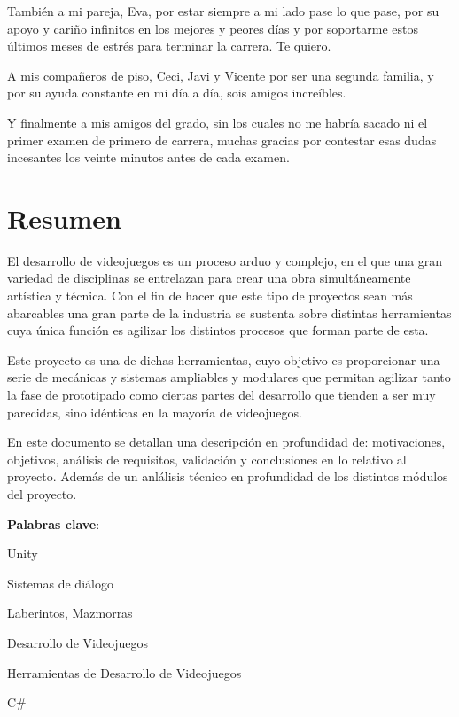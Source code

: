 \documentclass[12pt,twoside,titlepage]{report}
\newcommand\blankpage{%
    \newpage
    \null
    \thispagestyle{empty}%
    \newpage}
\begin{document}
También a mi pareja, Eva, por estar siempre a mi lado pase lo que pase, por su apoyo y cariño infinitos en los mejores y peores días y por soportarme estos últimos meses de estrés para terminar la carrera. Te quiero.

A mis compañeros de piso, Ceci, Javi y Vicente por ser una segunda familia, y por su ayuda constante en mi día a día, sois amigos increíbles.

Y finalmente a mis amigos del grado, sin los cuales no me habría sacado ni el primer examen de primero de carrera, muchas gracias por contestar esas dudas incesantes los veinte minutos antes de cada examen.


\afterpage{\blankpage}








\chapter*{Resumen}

El desarrollo de videojuegos es un proceso arduo y complejo, en el que una gran variedad de disciplinas se entrelazan para crear una obra simultáneamente artística y técnica.
 Con el fin de hacer que este tipo de proyectos sean más abarcables una gran parte de la industria se sustenta sobre distintas herramientas cuya única función es agilizar 
 los distintos procesos que forman parte de esta.

Este proyecto es una de dichas herramientas, cuyo objetivo es proporcionar una serie de mecánicas y sistemas ampliables y modulares que permitan agilizar tanto la fase de
 prototipado como ciertas partes del desarrollo que tienden a ser muy parecidas, sino idénticas en la mayoría de videojuegos.

En este documento se detallan una descripción en profundidad de: motivaciones, objetivos, análisis de requisitos, validación y conclusiones en lo relativo al proyecto.
 Además de un anlálisis técnico en profundidad de los distintos módulos del proyecto.

\mbox{} \bigskip

\noindent \textbf{Palabras clave}:
\begin{compactitem}
    \item Unity
    \item Sistemas de diálogo
    \item Laberintos, Mazmorras
    \item Desarrollo de Videojuegos
    \item Herramientas de Desarrollo de Videojuegos
    \item C\#
\end{compactitem}
\end{document}

